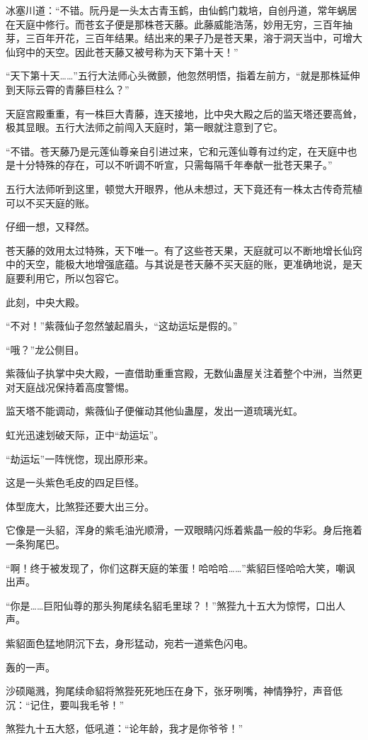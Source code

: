 \begin{this_body}
冰塞川道：“不错。阮丹是一头太古青玉鹤，由仙鹤门栽培，自创丹道，常年蜗居在天庭中修行。而苍玄子便是那株苍天藤。此藤威能浩荡，妙用无穷，三百年抽芽，三百年开花，三百年结果。结出来的果子乃是苍天果，溶于洞天当中，可增大仙窍中的天空。因此苍天藤又被号称为天下第十天！”

“天下第十天……”五行大法师心头微颤，他忽然明悟，指着左前方，“就是那株延伸到天际云霄的青藤巨柱么？”

天庭宫殿重重，有一株巨大青藤，连天接地，比中央大殿之后的监天塔还要高耸，极其显眼。五行大法师之前闯入天庭时，第一眼就注意到了它。

“不错。苍天藤乃是元莲仙尊亲自引进过来，它和元莲仙尊有过约定，在天庭中也是十分特殊的存在，可以不听调不听宣，只需每隔千年奉献一批苍天果子。”

五行大法师听到这里，顿觉大开眼界，他从未想过，天下竟还有一株太古传奇荒植可以不买天庭的账。

仔细一想，又释然。

苍天藤的效用太过特殊，天下唯一。有了这些苍天果，天庭就可以不断地增长仙窍中的天空，能极大地增强底蕴。与其说是苍天藤不买天庭的账，更准确地说，是天庭要利用它，所以包容它。

此刻，中央大殿。

“不对！”紫薇仙子忽然皱起眉头，“这劫运坛是假的。”

“哦？”龙公侧目。

紫薇仙子执掌中央大殿，一直借助重重宫殿，无数仙蛊屋关注着整个中洲，当然更对天庭战况保持着高度警惕。

监天塔不能调动，紫薇仙子便催动其他仙蛊屋，发出一道琉璃光虹。

虹光迅速划破天际，正中“劫运坛”。

“劫运坛”一阵恍惚，现出原形来。

这是一头紫色毛皮的四足巨怪。

体型庞大，比煞狴还要大出三分。

它像是一头貂，浑身的紫毛油光顺滑，一双眼睛闪烁着紫晶一般的华彩。身后拖着一条狗尾巴。

“啊！终于被发现了，你们这群天庭的笨蛋！哈哈哈……”紫貂巨怪哈哈大笑，嘲讽出声。

“你是……巨阳仙尊的那头狗尾续名貂毛里球？！”煞狴九十五大为惊愕，口出人声。

紫貂面色猛地阴沉下去，身形猛动，宛若一道紫色闪电。

轰的一声。

沙硕飚溅，狗尾续命貂将煞狴死死地压在身下，张牙咧嘴，神情狰狞，声音低沉：“记住，要叫我毛爷！”

煞狴九十五大怒，低吼道：“论年龄，我才是你爷爷！”


\end{this_body}

